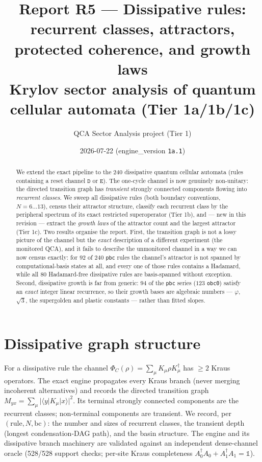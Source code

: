\documentclass[11pt]{article}
\title{\textbf{Report R5 --- Dissipative rules: recurrent classes, attractors,
protected coherence, and growth laws}\\
\large Krylov sector analysis of quantum cellular automata (Tier 1a/1b/1c)}
\author{QCA Sector Analysis project (Tier 1)}
\date{2026-07-22 \quad\small(engine\_version \texttt{1a.1})}
\newcommand{\rt}[1]{\texttt{#1}}
\begin{document}
\maketitle

\begin{abstract}
We extend the exact pipeline to the 240 dissipative quantum cellular automata
(rules containing a reset channel $\rt D$ or $\rt E$). The one-cycle channel is
now genuinely non-unitary: the directed transition graph has \emph{transient}
strongly connected components flowing into \emph{recurrent classes}. We sweep
all dissipative rules (both boundary conventions, $N=6\ldots13$), census their
attractor structure, classify each recurrent class by the peripheral spectrum of
its exact restricted superoperator (Tier 1b), and --- new in this revision ---
extract the \emph{growth laws} of the attractor count and the largest attractor
(Tier 1c). Two results organise the report. First, the transition graph is not a
lossy picture of the channel but the \emph{exact} description of a different
experiment (the monitored QCA), and it fails to describe the unmonitored channel
in a way we can now census exactly: for $92$ of $240$ \rt{pbc} rules the
channel's attractor is not spanned by computational-basis states at all, and
every one of those rules contains a Hadamard, while all $80$ Hadamard-free
dissipative rules are basis-spanned without exception. Second, dissipative
growth is far from generic: $94$ of the \rt{pbc} series ($123$ \rt{obc0}) satisfy
an \emph{exact} integer linear recurrence, so their growth bases are algebraic
numbers --- $\varphi$, $\sqrt3$, the supergolden and plastic constants --- rather
than fitted slopes.
\end{abstract}

\section{Dissipative graph structure}
For a dissipative rule the channel $\Phi_C(\rho)=\sum_\mu K_\mu\rho K_\mu^\dagger$
has $\ge 2$ Kraus operators. The exact engine propagates every Kraus branch
(never merging incoherent alternatives) and records the directed transition
graph $M_{yx}=\sum_\mu|\langle y|K_\mu|x\rangle|^2$. Its terminal strongly
connected components are the recurrent classes; non-terminal components are
transient. We record, per $(\text{rule},N,\text{bc})$: the number and sizes of
recurrent classes, the transient depth (longest condensation-DAG path), and the
basin structure. The engine and its dissipative branch machinery are validated
against an independent dense-channel oracle (528/528 support checks; per-site
Kraus completeness $A_0^\dagger A_0+A_1^\dagger A_1=\mathbb{1}$).
\end{document}
